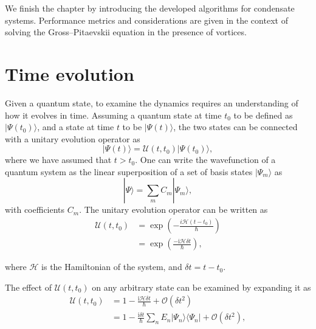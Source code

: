 We finish the chapter by introducing the developed algorithms for condensate systems. Performance metrics and considerations are given in the context of solving the Gross--Pitaevskii equation in the presence of vortices.

\section{Time evolution}\label{sec:timeev}
Given a quantum state, to examine the dynamics requires an understanding of how it evolves in time. Assuming a quantum state at time $t_0$ to be defined as $|\Psi(t_0) \rangle$, and a state at time $t$ to be $|\Psi(t) \rangle$, the two states can be connected with a unitary evolution operator as
\begin{equation}
    |\Psi(t) \rangle = \mathscr{U}(t,t_0) | \Psi(t_0) \rangle,
\end{equation}
where we have assumed that $t > t_0$. One can write the wavefunction of a quantum system as the linear superposition of a set of basis states $|\Psi_m\rangle$ as
\begin{equation}\label{eqn:psicomplete}
    |\Psi \rangle = \displaystyle\sum\limits_{m} C_m |\Psi_m \rangle,
\end{equation}
with coefficients $C_m$. The unitary evolution operator can be written as
\begin{align}
   \mathscr{U}(t,t_0) &= \exp\left(-\frac{i\mathcal{H}(t - t_0)}{\hbar} \right) \\ &= \exp\left(\frac{-\text{i}\mathcal{H}\delta t}{\hbar}\right),
\end{align}
\iffalse
\begin{align}
   \mathscr{U}(t,t_0) &= \exp\left(-\frac{i}{\hbar}\displaystyle\int\limits_{t_0}^{t}\mathcal{H}\text{d}t\right),
\end{align}
\fi
where $\mathcal{H}$ is the Hamiltonian of the system, and $\delta t = t - t_0$. %

The effect of $\mathscr{U}(t,t_0)$ on any arbitrary state can be examined by expanding it as
\begin{subequations}
    \begin{align}
        \mathscr{U}(t,t_0) &= 1 - \frac{\textrm{i}\mathcal{H}\delta t}{\hbar} + \mathcal{O}(\delta t^2) \\
        &= 1 - \frac{\textrm{i}\delta t}{\hbar}{\displaystyle\sum\limits_{n} E_n |\Psi_n\rangle \langle \Psi_n |} + \mathcal{O}(\delta t^2),
    \end{align}
\end{subequations}

